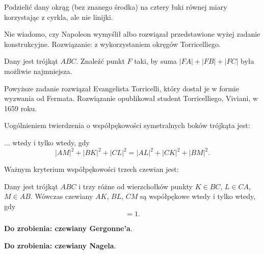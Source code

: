 
\begin{problem}
	Podzielić dany okrąg (bez znanego środka) na cztery łuki równej miary korzystając z cyrkla, ale nie linijki.
\end{problem}

Nie wiadomo, czy Napoleon wymyślił albo rozwiązał przedstawione wyżej zadanie konstrukcyjne.
Rozwiązanie: \cite[s. 116]{neugebauer} z wykorzystaniem okręgów Torricelliego.
%

\begin{problem}
	Dany jest trójkąt $ABC$.
	Znaleźć punkt $F$ taki, by suma $|FA| + |FB| + |FC|$ była możliwie najmniejsza.
\end{problem}

Powyższe zadanie rozwiązał Evangelista Torricelli, który dostał je w formie wyzwania od Fermata.
Rozwiązanie opublikował student Torricelliego, Viviani, w 1659 roku.

Uogólnieniem twierdzenia o współpękowości symetralnych boków trójkąta jest:

\begin{proposition}
	... wtedy i tylko wtedy, gdy
	\begin{equation}
		|AM|^2 + |BK|^2 + |CL|^2 = |AL|^2 + |CK|^2 + |BM|^2.
	\end{equation}
\end{proposition}

Ważnym kryterium współpękowości trzech czewian jest:

\begin{proposition}
	Dany jest trójkąt $ABC$ i trzy różne od wierzchołków punkty $K \in BC$, $L \in CA$, $M \in AB$.
	Wówczas czewiany $AK$, $BL$, $CM$ są współpękowe wtedy i tylko wtedy, gdy
	\begin{equation}
		[AMB] [BKC] [CLA] = 1.
	\end{equation}
\end{proposition}

\textbf{Do zrobienia: czewiany Gergonne'a}.

\textbf{Do zrobienia: czewiany Nagela}.



